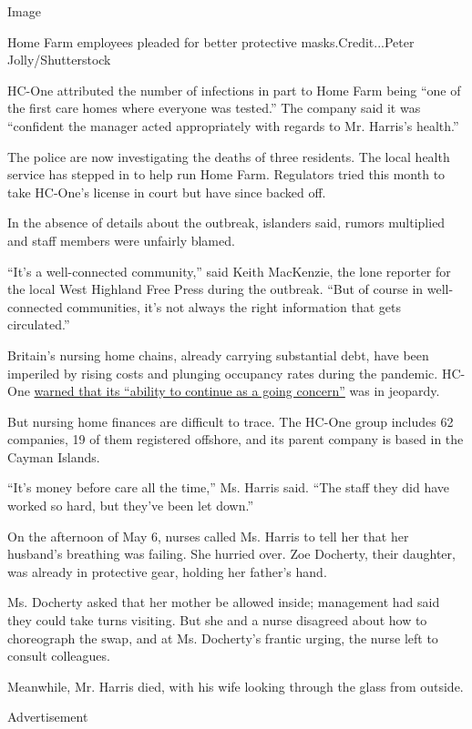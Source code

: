 Image

Home Farm employees pleaded for better protective masks.Credit...Peter
Jolly/Shutterstock

HC-One attributed the number of infections in part to Home Farm being
``one of the first care homes where everyone was tested.'' The company
said it was ``confident the manager acted appropriately with regards to
Mr. Harris's health.''

The police are now investigating the deaths of three residents. The
local health service has stepped in to help run Home Farm. Regulators
tried this month to take HC-One's license in court but have since backed
off.

In the absence of details about the outbreak, islanders said, rumors
multiplied and staff members were unfairly blamed.

``It's a well-connected community,'' said Keith MacKenzie, the lone
reporter for the local West Highland Free Press during the outbreak.
``But of course in well-connected communities, it's not always the right
information that gets circulated.''

Britain's nursing home chains, already carrying substantial debt, have
been imperiled by rising costs and plunging occupancy rates during the
pandemic. HC-One
\href{https://www.ft.com/content/edf259f8-7cb0-4d6f-b58f-7202a5d28e28}{warned
that its ``ability to continue as a going concern''} was in jeopardy.

But nursing home finances are difficult to trace. The HC-One group
includes 62 companies, 19 of them registered offshore, and its parent
company is based in the Cayman Islands.

``It's money before care all the time,'' Ms. Harris said. ``The staff
they did have worked so hard, but they've been let down.''

On the afternoon of May 6, nurses called Ms. Harris to tell her that her
husband's breathing was failing. She hurried over. Zoe Docherty, their
daughter, was already in protective gear, holding her father's hand.

Ms. Docherty asked that her mother be allowed inside; management had
said they could take turns visiting. But she and a nurse disagreed about
how to choreograph the swap, and at Ms. Docherty's frantic urging, the
nurse left to consult colleagues.

Meanwhile, Mr. Harris died, with his wife looking through the glass from
outside.

Advertisement

